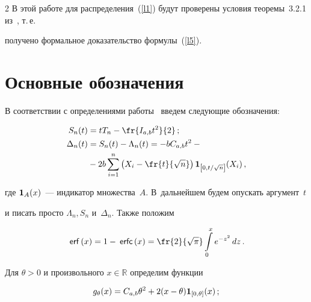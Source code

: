 \begin{multicols}{2}
В этой работе для распределения~(\ref{l1}) будут проверены условия теоремы~3.2.1 из~\cite{bening}, т.\,е.\ 


получено формальное доказательство формулы~(\ref{l5}).





\section{Основные обозначения}





В соответствии с определениями работы~\cite{article} введем следующие обозначения:


\begin{align}


S_n(t) &= tT_n - \fr{\iab t^2}{2}\,;\notag\\


\Delta_n(t) &= S_n(t) - \Lambda_n(t) = -b\cab t^2 -{}\notag\\


&{}-2b\sum\limits_{i=1}^n\left(X_i-\fr{t}{\sqrt{n}}\right)


{\III}_{\left[0,t/\sqrt{n}\right]}(X_i)\,,


\label{l7}


\end{align}


где ${{\bf 1}}_A(x)$~--- индикатор множества~$A$. В~дальнейшем будем опускать аргумент~$t$ 


и писать просто $\Lambda_n, S_n$ и~$\Delta_n$. Также положим


$$


\erx{x} = 1 - \ercx{x} = \fr{2}{\sqrt{\pi}} \int\limits_0^x e^{-z^2}\,dz\,.


$$


Для $\theta > 0$ и произвольного $x \in {\mathbb{R}}$ определим функции


\begin{equation}


g_{\theta}(x) = \cab \theta^2 + 2(x-\theta){\III}_{[0,\theta]}(x)\,;


\label{l8}


\end{equation}


\vspace*{-6pt}





\noindent



\end{multicols}
